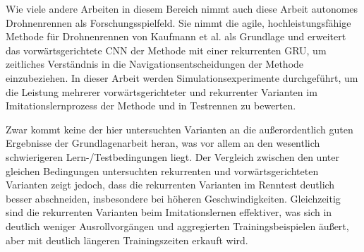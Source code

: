 Wie viele andere Arbeiten in diesem Bereich nimmt auch diese Arbeit 
autonomes Drohnenrennen als Forschungsspielfeld. 
Sie nimmt die agile, hochleistungsf{\"a}hige Methode f{\"u}r Drohnenrennen
von Kaufmann et al. \cite{Kaufmann2018} als Grundlage und erweitert das 
vorw{\"a}rtsgerichtete CNN der Methode mit einer rekurrenten GRU, 
um zeitliches Verst{\"a}ndnis in die Navigationsentscheidungen 
der Methode einzubeziehen. In dieser Arbeit werden Simulationsexperimente durchgef{\"u}hrt, 
um die Leistung mehrerer vorw{\"a}rtsgerichteter und rekurrenter Varianten im 
Imitationslernprozess der Methode und in Testrennen zu bewerten.

Zwar kommt keine der hier untersuchten Varianten an die au{\ss}erordentlich 
guten Ergebnisse der Grundlagenarbeit heran, 
was vor allem an den wesentlich schwierigeren Lern-/Testbedingungen liegt. 
Der Vergleich zwischen den unter gleichen Bedingungen untersuchten rekurrenten und 
vorw{\"a}rtsgerichteten Varianten zeigt jedoch, 
dass die rekurrenten Varianten im Renntest deutlich besser abschneiden, 
insbesondere bei h{\"o}heren Geschwindigkeiten. 
Gleichzeitig sind die rekurrenten Varianten beim Imitationslernen effektiver, 
was sich in deutlich weniger Ausrollvorg{\"a}ngen und aggregierten Trainingsbeispielen {\"a}u{\ss}ert, 
aber mit deutlich l{\"a}ngeren Trainingszeiten erkauft wird.

%

